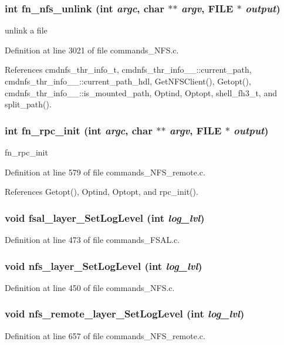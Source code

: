 \subsubsection{\setlength{\rightskip}{0pt plus 5cm}int fn\_\-nfs\_\-unlink (int {\em argc}, char $\ast$$\ast$ {\em argv}, FILE $\ast$ {\em output})}\label{commands_8h_a72}


unlink a file 

Definition at line 3021 of file commands\_\-NFS.c.

References cmdnfs\_\-thr\_\-info\_\-t, cmdnfs\_\-thr\_\-info\_\-\_\-::current\_\-path, cmdnfs\_\-thr\_\-info\_\-\_\-::current\_\-path\_\-hdl, Get\-NFSClient(), Getopt(), cmdnfs\_\-thr\_\-info\_\-\_\-::is\_\-mounted\_\-path, Optind, Optopt, shell\_\-fh3\_\-t, and split\_\-path().
\subsubsection{\setlength{\rightskip}{0pt plus 5cm}int fn\_\-rpc\_\-init (int {\em argc}, char $\ast$$\ast$ {\em argv}, FILE $\ast$ {\em output})}\label{commands_8h_a81}


fn\_\-rpc\_\-init 

Definition at line 579 of file commands\_\-NFS\_\-remote.c.

References Getopt(), Optind, Optopt, and rpc\_\-init().
\subsubsection{\setlength{\rightskip}{0pt plus 5cm}void fsal\_\-layer\_\-Set\-Log\-Level (int {\em log\_\-lvl})}\label{commands_8h_a5}




Definition at line 473 of file commands\_\-FSAL.c.
\subsubsection{\setlength{\rightskip}{0pt plus 5cm}void nfs\_\-layer\_\-Set\-Log\-Level (int {\em log\_\-lvl})}\label{commands_8h_a59}




Definition at line 450 of file commands\_\-NFS.c.
\subsubsection{\setlength{\rightskip}{0pt plus 5cm}void nfs\_\-remote\_\-layer\_\-Set\-Log\-Level (int {\em log\_\-lvl})}\label{commands_8h_a80}




Definition at line 657 of file commands\_\-NFS\_\-remote.c.